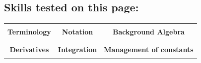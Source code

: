 \documentclass[12pt]{article}
\theoremstyle{definition}
\begin{document}
  \subsection*{Skills tested on this page:} 
  \begin{center}
  \begin{tabular}{|c|c|c|}
  \hline 
  && \\
  \textbf{Terminology} &
  \textbf{Notation} &
  \textbf{Background Algebra} \\ 
  && \\ \hline
  && \\
  \textbf{Derivatives} &
  \textbf{Integration} &
  \textbf{Management of constants} \\
  && \\ \hline
  \end{tabular}
  \end{center}
\end{document}

